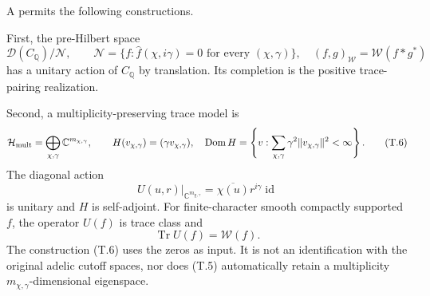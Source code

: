 \begin{theorem}
\label{AC-T04}
A permits the following constructions.

First, the pre-Hilbert space
\[
 \mathcal D(C_{\mathbb Q})/\mathcal N,\qquad
 \mathcal N=\{f:\widehat f(\chi,i\gamma)=0
                    \text{ for every }(\chi,\gamma)\},
 \quad
 (f,g)_{\mathcal W}=\mathcal W(f*g^*)
                                                               \tag{T.5}
\]
has a unitary action of \(C_{\mathbb Q}\) by translation.
Its completion is the positive trace-pairing realization.

Second, a multiplicity-preserving trace model is
\[
 \mathcal H_{\rm mult}
  =\bigoplus_{\chi,\gamma}\mathbb C^{m_{\chi,\gamma}},
 \qquad
 H(v_{\chi,\gamma})=(\gamma v_{\chi,\gamma}),\quad
 \operatorname{Dom}H
  =\left\{v:\sum_{\chi,\gamma}
             \gamma^2\|v_{\chi,\gamma}\|^2<\infty\right\}.        \tag{T.6}
\]
The diagonal action
\[
 U(u,r)|_{\mathbb C^{m_{\chi,\gamma}}}
       =\overline{\chi(u)}r^{i\gamma}\operatorname{id}
\]
is unitary and \(H\) is self-adjoint. For finite-character
smooth compactly supported \(f\), the operator \(U(f)\)
is trace class and
\[
 \operatorname{Tr}U(f)=\mathcal W(f).                            \tag{T.7}
\]
The construction (T.6) uses the zeros as input. It is not
an identification with the original adelic cutoff spaces,
nor does (T.5) automatically retain a multiplicity
\(m_{\chi,\gamma}\)-dimensional eigenspace.
\end{theorem}


